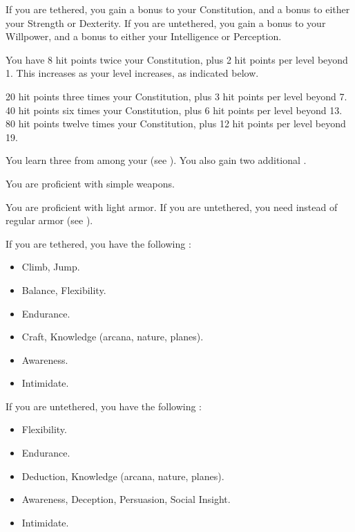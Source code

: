      If you are tethered, you gain a  bonus to your Constitution, and a  bonus to either your Strength or Dexterity.
      If you are untethered, you gain a  bonus to your Willpower, and a  bonus to either your Intelligence or Perception.

      You have 8 hit points \add twice your Constitution, plus 2 hit points per level beyond 1.
      This increases as your level increases, as indicated below.
      \begin{itemize}
         20 hit points \add three times your Constitution, plus 3 hit points per level beyond 7.
         40 hit points \add six times your Constitution, plus 6 hit points per level beyond 13.
         80 hit points \add twelve times your Constitution, plus 12 hit points per level beyond 19.
      \end{itemize}

      You learn three  from among your  (see ).
      You also gain two additional .

      You are proficient with simple weapons.

      You are proficient with light armor.
      If you are untethered, you need  instead of regular armor (see ).

      If you are tethered, you have the following :
      \begin{itemize}
        \item {} Climb, Jump.
        \item {} Balance, Flexibility.
        \item {} Endurance.
        \item {} Craft, Knowledge (arcana, nature, planes).
        \item {} Awareness.
        \item {} Intimidate.
      \end{itemize}

      If you are untethered, you have the following :
      \begin{itemize}
        \item {} Flexibility.
        \item {} Endurance.
        \item {} Deduction, Knowledge (arcana, nature, planes).
        \item {} Awareness, Deception, Persuasion, Social Insight.
        \item {} Intimidate.
      \end{itemize}

